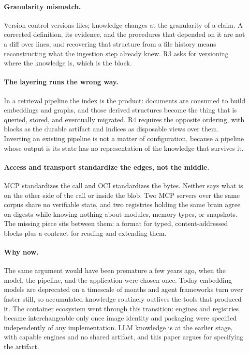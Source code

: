 \documentclass[11pt,a4paper]{article}
\begin{document}
\paragraph{Granularity mismatch.}
Version control versions files; knowledge changes at the granularity of a
claim. A corrected definition, its evidence, and the procedures that depended on it
are not a diff over lines, and recovering that structure from a file history
means reconstructing what the ingestion step already knew. R3 asks for versioning where the knowledge is, which is the block.

\paragraph{The layering runs the wrong way.}
In a retrieval pipeline the index is the product: documents are consumed to
build embeddings and graphs, and those derived structures become the thing that
is queried, stored, and eventually migrated. R4 requires the opposite ordering,
with blocks as the durable artifact and indices as disposable views over them.
Inverting an existing pipeline is not a matter of configuration, because a
pipeline whose output is its state has no representation of the knowledge that
survives it.

\paragraph{Access and transport standardize the edges, not the middle.}
MCP standardizes the call and OCI standardizes the bytes. Neither says what is
on the other side of the call or inside the blob. Two MCP servers over the same
corpus share no verifiable state, and two registries holding the same brain
agree on digests while knowing nothing about modules, memory types, or
snapshots. The missing piece sits between them: a format for typed,
content-addressed blocks plus a contract for reading and extending them.

\paragraph{Why now.}
The same argument would have been premature a few years ago, when the model,
the pipeline, and the application were chosen once. Today embedding models are
deprecated on a timescale of months and agent frameworks turn over faster
still, so accumulated knowledge routinely outlives the tools that produced it. The container ecosystem went through this
transition: engines and registries became interchangeable only once image
identity and packaging were specified independently of any implementation.
LLM knowledge is at the earlier stage, with capable engines and no shared
artifact, and this paper argues for specifying the artifact.
\end{document}
